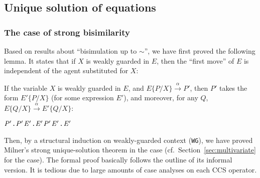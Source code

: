 
\subsection{Unique solution of equations}
\label{ss:part2}

\subsubsection{The case of strong bisimilarity}

Based on results about ``bisimulation up to $\sim$'', we have first proved the following
 lemma. It states  that if $X$ is weakly guarded
in $E$, then the ``first move'' of $E$ is independent of the agent
substituted for $X$:
\begin{lemma}
\label{lem:313}
If the variable $X$ is weakly guarded in $E$, and
$E\{P/X\}\overset{\alpha}{\rightarrow} P'$, then $P'$ takes the form
$E'\{P/X\}$ (for some expression $E'$), and moreover, for any $Q$,
$E\{Q/X\}\overset{\alpha}{\rightarrow} E'\{Q/X\}$:
\begin{alltt}
\HOLTokenTurnstile{}   \HOLSymConst{\HOLTokenImp{}}
   \HOLSymConst{\HOLTokenForall{}}  \ensuremath{\HOLBoundVar{P}\sp{\prime}}.   \HOLTokenTransBegin{}\HOLTokenTransEnd \ensuremath{\HOLBoundVar{P}\sp{\prime}} \HOLSymConst{\HOLTokenImp{}} \HOLSymConst{\HOLTokenExists{}}\ensuremath{\HOLBoundVar{E}\sp{\prime}}.  \ensuremath{\HOLBoundVar{E}\sp{\prime}} \HOLSymConst{\HOLTokenConj{}} \ensuremath{\HOLBoundVar{P}\sp{\prime}} \HOLSymConst{\ensuremath{=}} \ensuremath{\HOLBoundVar{E}\sp{\prime}}  \HOLSymConst{\HOLTokenConj{}} \HOLSymConst{\HOLTokenForall{}}.   \HOLTokenTransBegin{}\HOLTokenTransEnd \ensuremath{\HOLBoundVar{E}\sp{\prime}} 
\end{alltt}
\end{lemma}

Then, by a structural induction on weakly-guarded context
(\texttt{WG}), we have proved Milner's strong unique-solution theorem
in the \univariate case (cf.~Section~\ref{sec:multivariate} for the
\multivariate case). The formal proof basically follows the outline of its
informal version. It is tedious due to large amounts of case analyses
on each CCS operator.

